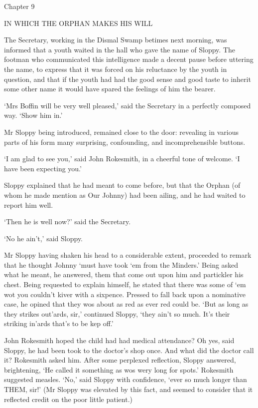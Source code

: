 Chapter 9

IN WHICH THE ORPHAN MAKES HIS WILL


The Secretary, working in the Dismal Swamp betimes next morning, was
informed that a youth waited in the hall who gave the name of Sloppy.
The footman who communicated this intelligence made a decent pause
before uttering the name, to express that it was forced on his
reluctance by the youth in question, and that if the youth had had
the good sense and good taste to inherit some other name it would have
spared the feelings of him the bearer.

‘Mrs Boffin will be very well pleased,’ said the Secretary in a
perfectly composed way. ‘Show him in.’

Mr Sloppy being introduced, remained close to the door: revealing
in various parts of his form many surprising, confounding, and
incomprehensible buttons.

‘I am glad to see you,’ said John Rokesmith, in a cheerful tone of
welcome. ‘I have been expecting you.’

Sloppy explained that he had meant to come before, but that the Orphan
(of whom he made mention as Our Johnny) had been ailing, and he had
waited to report him well.

‘Then he is well now?’ said the Secretary.

‘No he ain’t,’ said Sloppy.

Mr Sloppy having shaken his head to a considerable extent, proceeded
to remark that he thought Johnny ‘must have took ‘em from the Minders.’
Being asked what he meant, he answered, them that come out upon him and
partickler his chest. Being requested to explain himself, he stated that
there was some of ‘em wot you couldn’t kiver with a sixpence. Pressed to
fall back upon a nominative case, he opined that they wos about as
red as ever red could be. ‘But as long as they strikes out’ards, sir,’
continued Sloppy, ‘they ain’t so much. It’s their striking in’ards
that’s to be kep off.’

John Rokesmith hoped the child had had medical attendance? Oh yes, said
Sloppy, he had been took to the doctor’s shop once. And what did the
doctor call it? Rokesmith asked him. After some perplexed reflection,
Sloppy answered, brightening, ‘He called it something as wos wery
long for spots.’ Rokesmith suggested measles. ‘No,’ said Sloppy with
confidence, ‘ever so much longer than THEM, sir!’ (Mr Sloppy was
elevated by this fact, and seemed to consider that it reflected credit
on the poor little patient.)

